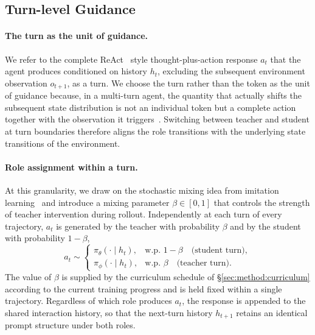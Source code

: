 \documentclass[11pt]{article}
\begin{document}
\subsection{Turn-level Guidance}
\label{sec:method:turn}

\paragraph{The turn as the unit of guidance.}
We refer to the complete ReAct~\citep{react} style thought-plus-action response $a_t$ that the agent produces conditioned on history $h_t$, excluding the subsequent environment observation $o_{t+1}$, as a turn. We choose the turn rather than the token as the unit of guidance because, in a multi-turn agent, the quantity that actually shifts the subsequent state distribution is not an individual token but a complete action together with the observation it triggers~\citep{zhong2026sod}. Switching between teacher and student at turn boundaries therefore aligns the role transitions with the underlying state transitions of the environment.

\paragraph{Role assignment within a turn.}
At this granularity, we draw on the stochastic mixing idea from imitation learning~\citep{DAgger} and introduce a mixing parameter $\beta \in [0, 1]$ that controls the strength of teacher intervention during rollout. Independently at each turn of every trajectory, $a_t$ is generated by the teacher with probability $\beta$ and by the student with probability $1 - \beta$,
\begin{equation}
    a_t \sim
    \begin{cases}
        \pi_\theta(\cdot \mid h_t), & \text{w.p. } 1 - \beta \quad \text{(student turn)}, \\
        \pi_\phi(\cdot \mid h_t),   & \text{w.p. } \beta \quad \text{(teacher turn)}.
    \end{cases}
    \label{eq:turn-mixing}
\end{equation}
The value of $\beta$ is supplied by the curriculum schedule of \S\ref{sec:method:curriculum} according to the current training progress and is held fixed within a single trajectory. Regardless of which role produces $a_t$, the response is appended to the shared interaction history, so that the next-turn history $h_{t+1}$ retains an identical prompt structure under both roles.
\end{document}

